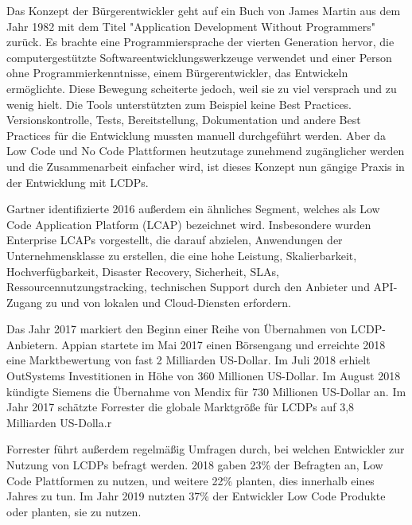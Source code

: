 \documentclass[12pt]{article} %
\begin{document}
	Das Konzept der Bürgerentwickler geht auf ein Buch von James Martin aus dem Jahr 1982 mit dem Titel "Application Development Without Programmers" zurück. Es brachte eine Programmiersprache der vierten Generation hervor, die computergestützte Softwareentwicklungswerkzeuge verwendet und einer Person ohne Programmierkenntnisse, einem Bürgerentwickler, das Entwickeln ermöglichte. Diese Bewegung scheiterte jedoch, weil sie zu viel versprach und zu wenig hielt. Die Tools unterstützten zum Beispiel keine Best Practices. Versionskontrolle, Tests, Bereitstellung, Dokumentation und andere Best Practices für die Entwicklung mussten manuell durchgeführt werden. Aber da Low Code und No Code Plattformen heutzutage zunehmend zugänglicher werden und die Zusammenarbeit einfacher wird, ist dieses Konzept nun gängige Praxis in der Entwicklung mit LCDPs. \autocite{KevinShuler.2023} \newline
	
	Gartner identifizierte 2016 außerdem ein ähnliches Segment, welches als Low Code Application Platform (LCAP) bezeichnet wird. Insbesondere wurden Enterprise LCAPs vorgestellt, die darauf abzielen, Anwendungen der Unternehmensklasse zu erstellen, die eine hohe Leistung, Skalierbarkeit, Hochverfügbarkeit, Disaster Recovery, Sicherheit, SLAs, Ressourcennutzungstracking, technischen Support durch den Anbieter und API-Zugang zu und von lokalen und Cloud-Diensten erfordern. \autocite{DiRuscio.2022} \newline %
	
	Das Jahr 2017 markiert den Beginn einer Reihe von Übernahmen von LCDP-Anbietern. Appian startete im Mai 2017 einen Börsengang und erreichte 2018 eine Marktbewertung von fast 2 Milliarden US-Dollar. Im Juli 2018 erhielt OutSystems Investitionen in Höhe von 360 Millionen US-Dollar. Im August 2018 kündigte Siemens die Übernahme von Mendix für 730 Millionen US-Dollar an. Im Jahr 2017 schätzte Forrester die globale Marktgröße für LCDPs auf 3,8 Milliarden US-Dolla.r \autocite{DiRuscio.2022} \newline 
		
	Forrester führt außerdem regelmäßig Umfragen durch, bei welchen Entwickler zur Nutzung von LCDPs befragt werden. 2018 gaben 23\% der Befragten an, Low Code Plattformen zu nutzen, und weitere 22\% planten, dies innerhalb eines Jahres zu tun. Im Jahr 2019 nutzten 37\% der Entwickler Low Code Produkte oder planten, sie zu nutzen. \autocite{DiRuscio.2022}\newline
	
\end{document}
